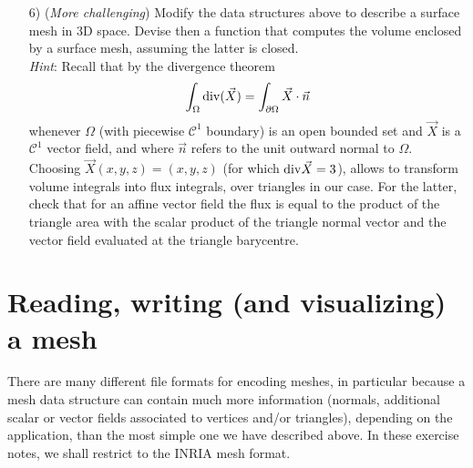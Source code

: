 \documentclass[a3paper,12pt]{article}
\begin{document}
\begin{itemize}
\item[6)] ({\it More challenging}) Modify the data structures above to describe a surface mesh in 3D space. Devise then a function that computes the volume enclosed by a surface mesh, assuming the latter is closed.\\
{\it Hint}: Recall that by the divergence theorem 
$$\int_\Omega {\rm div}( \vec X) = \int_{\partial\Omega} \vec X \cdot \vec n$$
whenever $\Omega$ (with piecewise $\mathcal{C}^1$ boundary) is an open bounded set and
$\vec X$ is a $\mathcal{C}^1$ vector field, and where $\vec n$ refers to the unit outward normal 
to $\Omega.$ Choosing $\vec X(x,y,z) = (x,y,z)$ 
(for which ${\rm div}\vec X = 3$), allows to transform volume integrals into
flux integrals, over triangles in our case. For the latter, check that for an
affine vector field the flux is equal to the product of the triangle area with
the scalar product of the triangle normal vector and the vector field evaluated
at the triangle barycentre.

\end{itemize}

\section{Reading, writing (and visualizing) a mesh}

There are many different file formats for encoding meshes, in particular because a mesh data structure can contain much more information (normals, additional scalar or vector fields associated to vertices and/or triangles), depending on the application, than the most simple one we have described above. In these exercise notes, we shall restrict to the INRIA mesh format.
\end{document}
